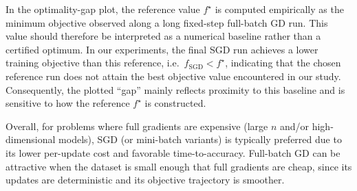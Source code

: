 In the optimality-gap plot, the reference value $f^\star$ is computed empirically as the minimum objective observed along a long fixed-step full-batch GD run. This value should therefore be interpreted as a numerical baseline rather than a certified optimum. In our experiments, the final SGD run achieves a lower training objective than this reference, i.e.\ $f_{\mathrm{SGD}} < f^\star$, indicating that the chosen reference run does not attain the best objective value encountered in our study. Consequently, the plotted ``gap'' mainly reflects proximity to this baseline and is sensitive to how the reference $f^\star$ is constructed.

Overall, for problems where full gradients are expensive (large $n$ and/or high-dimensional models), SGD (or mini-batch variants) is typically preferred due to its lower per-update cost and favorable time-to-accuracy. Full-batch GD can be attractive when the dataset is small enough that full gradients are cheap, since its updates are deterministic and its objective trajectory is smoother.